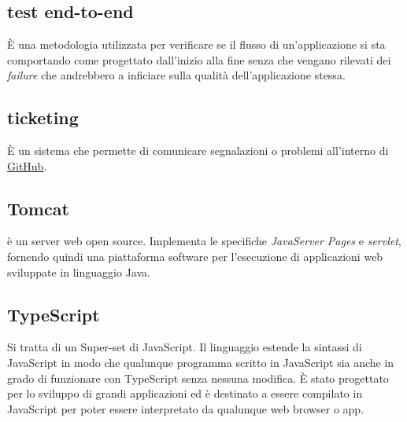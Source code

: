 \section{}
\subsection*{test end-to-end} È una metodologia utilizzata per verificare se il flusso di un’applicazione si sta comportando come progettato dall’inizio alla fine senza che vengano rilevati dei \textit{failure} che andrebbero a inficiare sulla qualità dell’applicazione stessa.
\subsection*{ticketing} È un sistema che permette di comunicare segnalazioni o problemi all'interno di \hyperref[sec:GitHub]{\underline{GitHub}}.
\subsection*{Tomcat} è un server web open source. Implementa le specifiche \textit{JavaServer Pages} e \textit{servlet}, fornendo quindi una piattaforma software per l'esecuzione di applicazioni web sviluppate in linguaggio Java.
\subsection*{TypeScript} Si tratta di un Super-set di JavaScript. Il linguaggio estende la sintassi di JavaScript in modo che qualunque programma scritto in JavaScript sia anche in grado di funzionare con TypeScript senza nessuna modifica. È stato progettato per lo sviluppo di grandi applicazioni ed è destinato a essere compilato in JavaScript per poter essere interpretato da qualunque web browser o app.